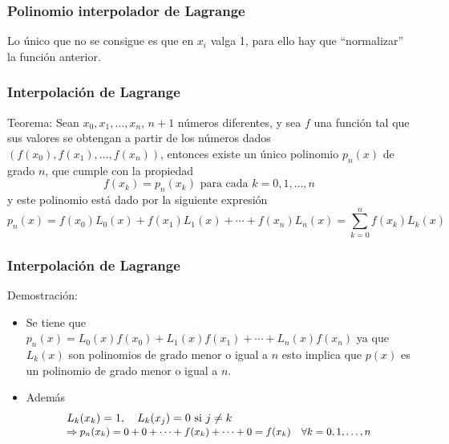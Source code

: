 \documentclass{beamer}
\begin{document}
\frame
{\frametitle{Polinomio interpolador de Lagrange}
Lo \'unico que no se consigue es que en $x_i$ valga 1, para ello hay que ``normalizar'' la funci\'on anterior.

}
\begin{frame}
  \frametitle{Interpolaci\'on de Lagrange}
\begin{block}{Teorema:}
  Sean $x_0, x_1, \ldots , x_n$, $n + 1$ n\'umeros diferentes, y sea $f$ una funci\'on tal que
sus valores se obtengan a partir de los n\'umeros dados $(f(x_0), f(x_1), \ldots , f(x_n))$, entonces
existe un \'unico polinomio $p_n(x)$ de grado $n$, que cumple con la propiedad
$$
f(x_k) = p_n(x_k) \text{ para cada }k = 0,1, \ldots , n
$$
y este polinomio est\'a dado por la siguiente expresi\'on
\small{
$$
p_n(x) = f(x_0)L_0(x) + f(x_1)L_1(x) + \cdots + f(x_n)L_n(x) = \sum_{k=0}^nf(x_k)L_k(x)
$$}
\end{block}
\end{frame}
\begin{frame}
  \frametitle{Interpolaci\'on de Lagrange}
  Demostraci\'on:
  \begin{itemize}
    \item Se tiene que $p_n(x)=L_0(x)f(x_0)+L_1(x)f(x_1)+\cdots+L_n(x)f(x_n)$ ya que $L_k(x)$ 
    son polinomios de grado menor o igual a $n$ esto implica que $p(x)$ es un polinomio de grado menor o igual a $n$.
    \item<2-> Adem\'as
    $$
    \begin{array}{l}
    L_k(x_k) = 1,\quad L_k(x_j) =0 \mbox{ si $j \neq k$}\\
    \text{\small $\Rightarrow p_n(x_k) = 0 + 0 + \cdots + f(x_k) + \cdots + 0 = f(x_k) \quad \forall k=0,1,\ldots,n$}
    \end{array}
    $$
  \end{itemize}
\end{frame}
\end{document}
